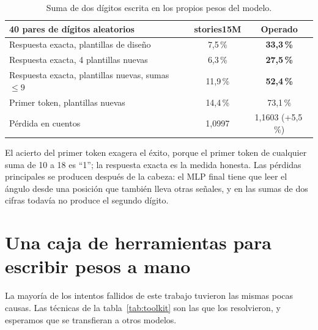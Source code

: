 \documentclass[11pt]{article}
\begin{document}
\begin{table}[h]
\centering
\begin{tabular}{lcc}
\toprule
40 pares de dígitos aleatorios & stories15M & Operado \\
\midrule
Respuesta exacta, plantillas de diseño & 7,5\,\% & \textbf{33,3\,\%} \\
Respuesta exacta, 4 plantillas nuevas & 6,3\,\% & \textbf{27,5\,\%} \\
Respuesta exacta, plantillas nuevas, sumas $\le 9$ & 11,9\,\% & \textbf{52,4\,\%} \\
Primer token, plantillas nuevas & 14,4\,\% & 73,1\,\% \\
Pérdida en cuentos & 1,0997 & 1,1603 (+5,5\,\%) \\
\bottomrule
\end{tabular}
\caption{Suma de dos dígitos escrita en los propios pesos del modelo.}
\end{table}

El acierto del primer token exagera el éxito, porque el primer token de cualquier suma de 10 a 18 es ``1''; la respuesta exacta es la medida honesta. Las pérdidas principales se producen después de la cabeza: el MLP final tiene que leer el ángulo desde una posición que también lleva otras señales, y en las sumas de dos cifras todavía no produce el segundo dígito.

\section{Una caja de herramientas para escribir pesos a mano}\label{sec:toolkit}
La mayoría de los intentos fallidos de este trabajo tuvieron las mismas pocas causas. Las técnicas de la tabla~\ref{tab:toolkit} son las que los resolvieron, y esperamos que se transfieran a otros modelos.
\end{document}
